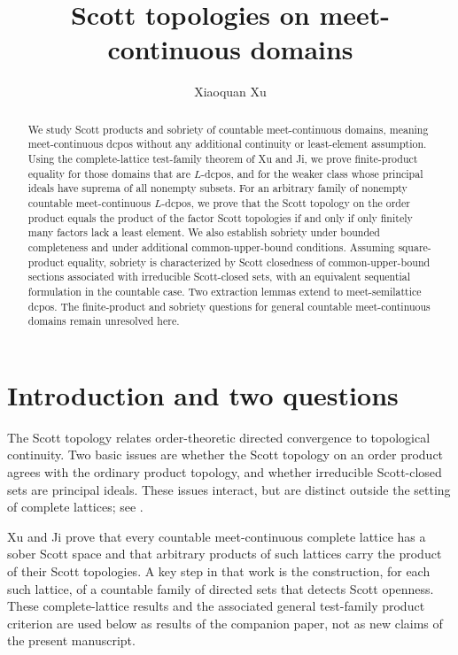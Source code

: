 \documentclass[11pt,reqno]{amsart}
\title[Scott topologies on meet-continuous domains]{Scott topologies on meet-continuous domains}
\author{Xiaoquan Xu}
\theoremstyle{definition}
\theoremstyle{remark}
\numberwithin{equation}{section}
\begin{document}
\begin{abstract}
We study Scott products and sobriety of countable meet-continuous domains, meaning meet-continuous dcpos without any additional continuity or least-element assumption. Using the complete-lattice test-family theorem of Xu and Ji, we prove finite-product equality for those domains that are $L$-dcpos, and for the weaker class whose principal ideals have suprema of all nonempty subsets. For an arbitrary family of nonempty countable meet-continuous $L$-dcpos, we prove that the Scott topology on the order product equals the product of the factor Scott topologies if and only if only finitely many factors lack a least element. We also establish sobriety under bounded completeness and under additional common-upper-bound conditions. Assuming square-product equality, sobriety is characterized by Scott closedness of common-upper-bound sections associated with irreducible Scott-closed sets, with an equivalent sequential formulation in the countable case. Two extraction lemmas extend to meet-semilattice dcpos. The finite-product and sobriety questions for general countable meet-continuous domains remain unresolved here.
\end{abstract}
\maketitle

\section{Introduction and two questions}
The Scott topology relates order-theoretic directed convergence to topological continuity. Two basic issues are whether the Scott topology on an order product agrees with the ordinary product topology, and whether irreducible Scott-closed sets are principal ideals. These issues interact, but are distinct outside the setting of complete lattices; see \cite{Gierz,LawsonXu,LawsonXuLower}.

Xu and Ji \cite{XuJi} prove that every countable meet-continuous complete lattice has a sober Scott space and that arbitrary products of such lattices carry the product of their Scott topologies. A key step in that work is the construction, for each such lattice, of a countable family of directed sets that detects Scott openness. These complete-lattice results and the associated general test-family product criterion are used below as results of the companion paper, not as new claims of the present manuscript.
\end{document}
